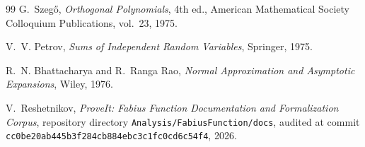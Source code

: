 \documentclass[11pt,oneside]{article}
\theoremstyle{definition}
\theoremstyle{remark}
\begin{document}
\begin{thebibliography}{99}
G.~Szeg\H{o},
\newblock \emph{Orthogonal Polynomials}, 4th ed.,
\newblock American Mathematical Society Colloquium Publications, vol.~23, 1975.

V.~V. Petrov,
\newblock \emph{Sums of Independent Random Variables},
\newblock Springer, 1975.

R.~N. Bhattacharya and R.~Ranga Rao,
\newblock \emph{Normal Approximation and Asymptotic Expansions},
\newblock Wiley, 1976.

V.~Reshetnikov,
\newblock \emph{ProveIt: Fabius Function Documentation and Formalization Corpus},
\newblock repository directory \texttt{Analysis/FabiusFunction/docs}, audited at commit \texttt{cc0be20ab445b3f284cb884ebc3c1fc0cd6c54f4}, 2026.

\end{thebibliography}
\end{document}
